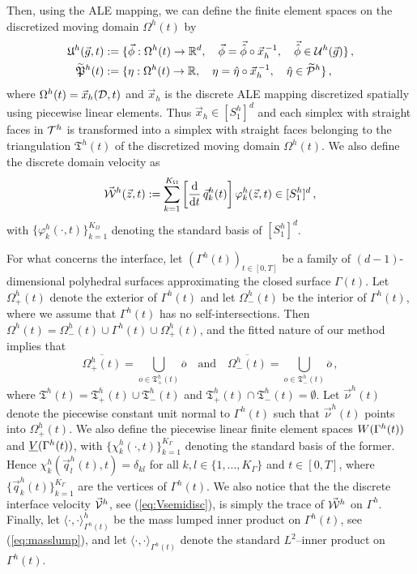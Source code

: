 Then, using the ALE mapping, we can define the finite element spaces on
the discretized moving domain $\Omega^h(t)$ by
\begin{align*}
\uspacesemidiscale{g}{h}{t} &:= \{ \vec\phi:
\Omega^h(t) \to \R^d,\quad
\vec \phi=\vec{\hat\phi}\circ\vec x_h^{\,-1},\quad\vec{\hat\phi}
\in\uspacesemidiscref{g}{h}\}\,,\\
\pnormspaceale^h(t) &:= \{ \eta: \Omega^h(t)\to \R,\quad
\eta=\hat\eta\circ\vec x_h^{\,-1},\quad\hat\eta\in\pnormspaceref^h \}\,,
\end{align*}
where $\Omega^h(t)=\vec x_h(\D,t)$ and $\vec x_h$ is the discrete ALE mapping
discretized spatially using piecewise linear elements. Thus
$\vec x_h\in [S^h_1]^d$ and each simplex with straight faces in ${\cal
T}^h$ is transformed into a simplex with straight faces belonging to the
triangulation $\mathfrak{T}^h(t)$ of the discretized moving domain
$\Omega^h(t)$. We also define the discrete domain velocity as
\begin{equation}
\W^h(\vec z, t):=
\sum_{k=1}^{K_\Omega}\left[\ddt\,\vec q^h_k(t)\right] \varphi^h_k(\vec z, t)
\in [S^h_1]^d\,,
\end{equation}
with $\{\varphi^h_k(\cdot,t)\}_{k=1}^{K_\Omega}$ denoting the standard basis of
$[S^h_1]^d$.

For what concerns the interface, let $(\Gamma^h(t))_{t\in[0,T]}$  be a family of
$(d-1)$-dimensional polyhedral surfaces approximating the closed surface
$\Gamma(t)$. Let $\Omega^h_+(t)$ denote the exterior of $\Gamma^h(t)$ and let
$\Omega^h_-(t)$ be the interior of $\Gamma^h(t)$, where we assume that
$\Gamma^h(t)$ has no self-intersections. Then $\Omega^h(t) = \Omega_-^h(t) \cup
\Gamma^h(t) \cup \Omega_+^h(t)$, and the fitted nature of our method implies
that
\begin{equation} \label{eq:fittedO_ale}
\overline{\Omega^h_+(t)} = \bigcup_{o \in \mathfrak{T}^h_+(t)} \overline{o}
\quad\text{and}\quad
\overline{\Omega^h_-(t)} = \bigcup_{o \in \mathfrak{T}^h_-(t)} \overline{o} \,,
\end{equation}
where $\mathfrak{T}^h(t) = \mathfrak{T}^h_+(t) \cup \mathfrak{T}^h_-(t)$ and
$\mathfrak{T}^h_+(t) \cap \mathfrak{T}^h_-(t) = \emptyset$.
Let $\vec \nu^h(t)$ denote the piecewise constant unit normal to $\Gamma^h(t)$
such that $\vec\nu^h(t)$ points into $\Omega^h_+(t)$. We also define the
piecewise linear finite element spaces $\Wht$ and $\Vht$, with
$\{\chi^h_k(\cdot,t)\}_{k=1}^{K_\Gamma}$ denoting the standard basis of the
former. Hence $\chi^h_k(\vec q^h_l(t),t) = \delta_{kl}$ for all
$k,l \in \{1,\ldots,K_\Gamma\}$ and $t \in [0,T]$, where
$\{\vec q^h_k(t)\}_{k=1}^{K_\Gamma}$ are the vertices of $\Gamma^h(t)$. We also
notice that the the discrete interface velocity $\V^h$, see
(\ref{eq:Vsemidisc}), is simply the trace of $\W^h$ on $\Gamma^h$. Finally, let
$\langle\cdot,\cdot\rangle_{\Gamma^h(t)}^h$ be the mass lumped inner product on
$\Gamma^h(t)$, see (\ref{eq:masslump}), and let
$\langle\cdot,\cdot\rangle_{\Gamma^h(t)}$ denote the standard $L^2$--inner
product on $\Gamma^h(t)$.

